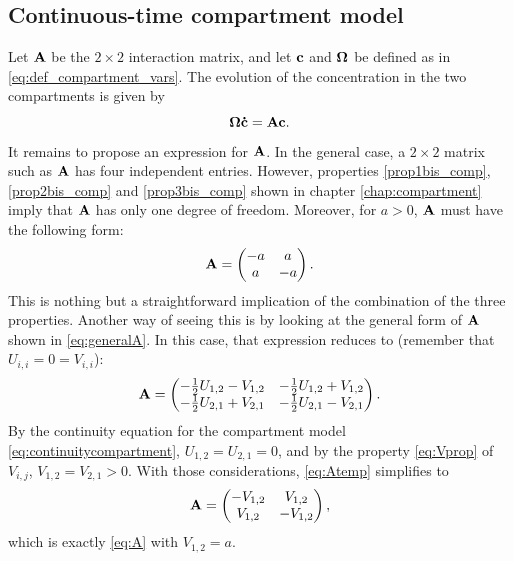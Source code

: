 \subsection{Continuous-time compartment model} \label{sec:ctcm}
Let $\mathbf A$ be the $2 \times 2$ interaction matrix, and let $\mathbf c$ and $\boldsymbol \Omega$ be defined as in \eqref{eq:def_compartment_vars}. The evolution of the concentration in the two compartments is given by
\begin{equation} \label{eq:generalEDOp2b}
 	\boldsymbol \Omega \mathbf{\dot{c}} = \mathbf A \mathbf c.
\end{equation}
It remains to propose an expression for $\mathbf A$. In the general case, a $2 \times 2$ matrix such as $\mathbf A$ has four independent entries. However, properties \ref{prop1bis_comp}, \ref{prop2bis_comp} and \ref{prop3bis_comp} shown in chapter \ref{chap:compartment} imply that $\mathbf A$ has only one degree of freedom. Moreover, for $a > 0$, $\mathbf A$ must have the following form:
\begin{equation} \label{eq:A}
	\mathbf A = \begin{pmatrix}
		-a & a\\
		a & -a
	\end{pmatrix}.
\end{equation}
This is nothing but a straightforward implication of the combination of the three properties. Another way of seeing this is by looking at the general form of $\mathbf A$ shown in \eqref{eq:generalA}. In this case, that expression reduces to (remember that $U_{i,i} = 0 = V_{i,i}$):
\begin{equation} \label{eq:Atemp}
	\mathbf A = \begin{pmatrix}
		-\frac{1}{2} U_{1,2} - V_{1,2} & -\frac{1}{2}U_{1,2} + V_{1,2}\\
		-\frac{1}{2}U_{2,1} + V_{2,1} & -\frac{1}{2}U_{2,1} - V_{2,1}
	\end{pmatrix}.
\end{equation}
By the continuity equation for the compartment model \eqref{eq:continuitycompartment}, $U_{1,2} = U_{2,1} = 0$, and by the property \eqref{eq:Vprop} of $V_{i,j}$, $V_{1,2} = V_{2,1} > 0$. With those considerations, \eqref{eq:Atemp} simplifies to
\begin{equation}
	\mathbf A = \begin{pmatrix}
		- V_{1,2} & V_{1,2}\\
		V_{1,2} & -V_{1,2}
	\end{pmatrix},
\end{equation}
which is exactly \eqref{eq:A} with $V_{1,2} = a$.

